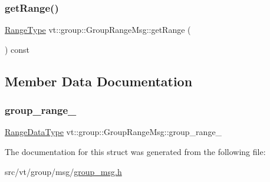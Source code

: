 \subsubsection{\texorpdfstring{get\+Range()}{getRange()}}
{\footnotesize\ttfamily \hyperlink{structvt_1_1group_1_1_group_range_msg_a49fdcbb2ae53a4c5778e60f306c8f5e6}{Range\+Type} vt\+::group\+::\+Group\+Range\+Msg\+::get\+Range (\begin{DoxyParamCaption}{ }\end{DoxyParamCaption}) const\hspace{0.3cm}{\ttfamily [inline]}}



\subsection{Member Data Documentation}
\mbox{\label{structvt_1_1group_1_1_group_range_msg_affc9dc8fa60a656874103d836ba5a3b8}} 
\subsubsection{\texorpdfstring{group\+\_\+range\+\_\+}{group\_range\_}}
{\footnotesize\ttfamily \hyperlink{structvt_1_1group_1_1_group_range_msg_a893386277e3598ae990bea8245aee1f3}{Range\+Data\+Type} vt\+::group\+::\+Group\+Range\+Msg\+::group\+\_\+range\+\_\+\hspace{0.3cm}{\ttfamily [private]}}



The documentation for this struct was generated from the following file\+:\begin{DoxyCompactItemize}
\item 
src/vt/group/msg/\hyperlink{group__msg_8h}{group\+\_\+msg.\+h}\end{DoxyCompactItemize}
